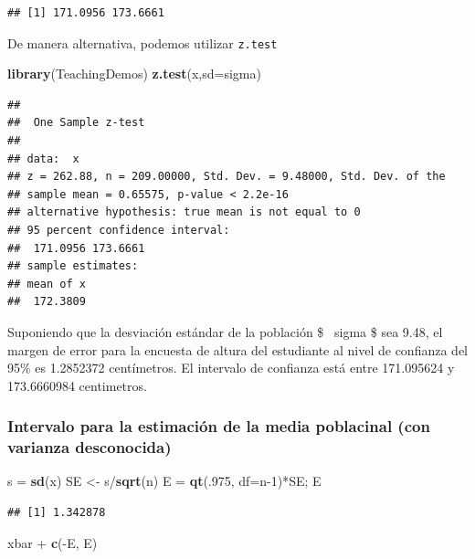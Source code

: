 \documentclass[]{article}
\newenvironment{Shaded}{\begin{snugshade}}{\end{snugshade}}
\newcommand{\KeywordTok}[1]{\textcolor[rgb]{0.13,0.29,0.53}{\textbf{{#1}}}}
\newcommand{\DataTypeTok}[1]{\textcolor[rgb]{0.13,0.29,0.53}{{#1}}}
\newcommand{\DecValTok}[1]{\textcolor[rgb]{0.00,0.00,0.81}{{#1}}}
\newcommand{\StringTok}[1]{\textcolor[rgb]{0.31,0.60,0.02}{{#1}}}
\newcommand{\NormalTok}[1]{{#1}}
\numberwithin{equation}{section}
\begin{document}
\begin{verbatim}
## [1] 171.0956 173.6661
\end{verbatim}

De manera alternativa, podemos utilizar \texttt{z.test}

\begin{Shaded}
\begin{Highlighting}[]
\KeywordTok{library}\NormalTok{(TeachingDemos)}
\KeywordTok{z.test}\NormalTok{(x,}\DataTypeTok{sd=}\NormalTok{sigma)}
\end{Highlighting}
\end{Shaded}

\begin{verbatim}
## 
##  One Sample z-test
## 
## data:  x
## z = 262.88, n = 209.00000, Std. Dev. = 9.48000, Std. Dev. of the
## sample mean = 0.65575, p-value < 2.2e-16
## alternative hypothesis: true mean is not equal to 0
## 95 percent confidence interval:
##  171.0956 173.6661
## sample estimates:
## mean of x 
##  172.3809
\end{verbatim}

Suponiendo que la desviación estándar de la población \$ ~sigma \$ sea
9.48, el margen de error para la encuesta de altura del estudiante al
nivel de confianza del 95\% es 1.2852372 centímetros. El intervalo de
confianza está entre 171.095624 y 173.6660984 centimetros.

\subsubsection{Intervalo para la estimación de la media poblacinal (con
varianza
desconocida)}\label{intervalo-para-la-estimacion-de-la-media-poblacinal-con-varianza-desconocida}

\begin{Shaded}
\begin{Highlighting}[]
\NormalTok{s =}\StringTok{ }\KeywordTok{sd}\NormalTok{(x)}
\NormalTok{SE <-}\StringTok{ }\NormalTok{s/}\KeywordTok{sqrt}\NormalTok{(n)}
\NormalTok{E =}\StringTok{ }\KeywordTok{qt}\NormalTok{(.}\DecValTok{975}\NormalTok{, }\DataTypeTok{df=}\NormalTok{n}\DecValTok{-1}\NormalTok{)*SE; E}
\end{Highlighting}
\end{Shaded}

\begin{verbatim}
## [1] 1.342878
\end{verbatim}

\begin{Shaded}
\begin{Highlighting}[]
\NormalTok{xbar +}\StringTok{ }\KeywordTok{c}\NormalTok{(-E, E) }
\end{Highlighting}
\end{Shaded}
\end{document}
